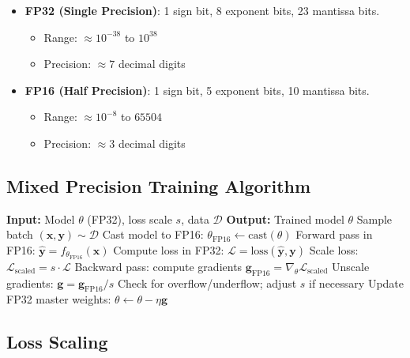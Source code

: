 \documentclass[12pt]{report}
\theoremstyle{definition}
\newcommand{\loss}{\mathcal{L}}
\begin{document}
\begin{itemize}
\item \textbf{FP32 (Single Precision)}: 1 sign bit, 8 exponent bits, 23 mantissa bits.
  \begin{itemize}
  \item Range: $\approx 10^{-38}$ to $10^{38}$
  \item Precision: $\approx 7$ decimal digits
  \end{itemize}

\item \textbf{FP16 (Half Precision)}: 1 sign bit, 5 exponent bits, 10 mantissa bits.
  \begin{itemize}
  \item Range: $\approx 10^{-8}$ to $65504$
  \item Precision: $\approx 3$ decimal digits
  \end{itemize}
\end{itemize}

\subsection{Mixed Precision Training Algorithm}

\begin{algorithm}[H]
\caption{Mixed Precision Training with Loss Scaling}
\label{alg:mixed_precision}
\begin{algorithmic}[1]
\STATE \textbf{Input:} Model $\theta$ (FP32), loss scale $s$, data $\mathcal{D}$
\STATE \textbf{Output:} Trained model $\theta$
    \STATE Sample batch $(\mathbf{x}, \mathbf{y}) \sim \mathcal{D}$
    \STATE Cast model to FP16: $\theta_{\text{FP16}} \leftarrow \text{cast}(\theta)$
    \STATE Forward pass in FP16: $\hat{\mathbf{y}} = f_{\theta_{\text{FP16}}}(\mathbf{x})$
    \STATE Compute loss in FP32: $\loss = \text{loss}(\hat{\mathbf{y}}, \mathbf{y})$
    \STATE Scale loss: $\loss_{\text{scaled}} = s \cdot \loss$
    \STATE Backward pass: compute gradients $\mathbf{g}_{\text{FP16}} = \nabla_\theta \loss_{\text{scaled}}$
    \STATE Unscale gradients: $\mathbf{g} = \mathbf{g}_{\text{FP16}} / s$
    \STATE Check for overflow/underflow; adjust $s$ if necessary
    \STATE Update FP32 master weights: $\theta \leftarrow \theta - \eta \mathbf{g}$
\ENDWHILE
\end{algorithmic}
\end{algorithm}

\subsection{Loss Scaling}
\end{document}
